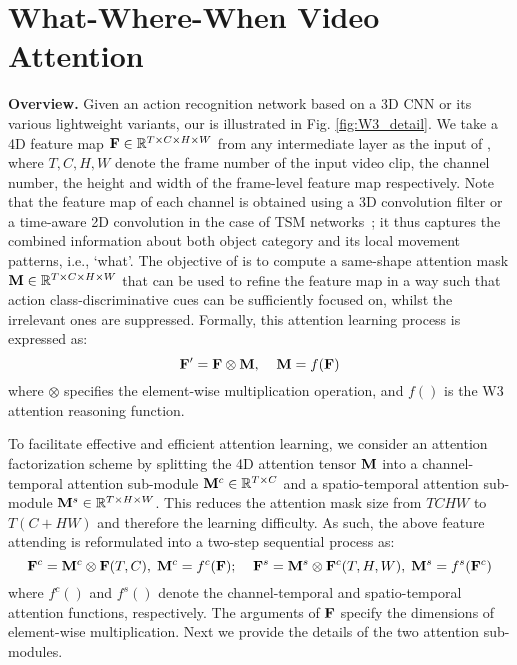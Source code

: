 \documentclass[runningheads]{llncs}
\newcommand{\keypoint}[1]{\vspace{0.1cm}\noindent\textbf{#1}\quad}
\begin{document}
\section{ What-Where-When Video Attention}


\keypoint{Overview.}
Given an action recognition network based on a 3D CNN or its various lightweight variants, our \shortname{} is illustrated in Fig. \ref{fig:W3_detail}. We take a 4D feature map ${\bf F} \in \mathbb{R}^{T\times C\times H \times W}$ from any intermediate layer as the input of \shortname{}, 
where $T, C, H, W$ denote the frame number of the input video clip, the channel number, the height and width of the frame-level feature map respectively. 
Note that the feature map of each channel is obtained using a 3D convolution filter or a time-aware 2D convolution in the case of TSM networks~\cite{zhou2018temporal}; it thus captures the combined information about both object category and its local movement patterns, i.e., `what'. 
The objective of \shortname{} is to compute a same-shape attention mask ${\bf M} \in \mathbb{R}^{T\times C\times H \times W}$ that can be used to refine the feature map in a way such that action class-discriminative cues can be sufficiently focused on, whilst the irrelevant ones are suppressed.
Formally, this attention learning process is expressed as:
\begin{equation}
    {\bf F}' = {\bf F} \otimes {\bf M}, \;\;\;\; {\bf M} = f({\bf F})
\end{equation}
where $\otimes$ specifies the element-wise multiplication operation, and $f()$ is the W3 attention reasoning function. 

To facilitate effective and efficient attention learning, 
we consider an attention factorization scheme
by splitting the 4D attention tensor ${\bf M}$ into
a channel-temporal attention sub-module ${\bf M}^c \in \mathbb{R}^{T\times C}$
and 
a spatio-temporal attention sub-module ${\bf M}^s \in \mathbb{R}^{T\times H \times W}$.
This reduces the attention mask size from $TCHW$ to $T(C+HW)$ and therefore
the learning difficulty.
As such, the above feature attending is reformulated into a two-step sequential process as:
\begin{equation}
    {\bf F}^c = {\bf M}^c \otimes {\bf F}(T,C), \; {\bf M}^c = f^c({\bf F}); \;\;\;\;
    {\bf F}^s = {\bf M}^s \otimes {\bf F}^c(T,H,W), \; {\bf M}^s = f^s({\bf F}^c)
\end{equation}
where $f^c()$ and $f^s()$ denote the channel-temporal and spatio-temporal attention functions, respectively.
The arguments of ${\bf F}$ specify the dimensions of element-wise multiplication.
Next we provide the details of the two attention sub-modules.
\end{document}
